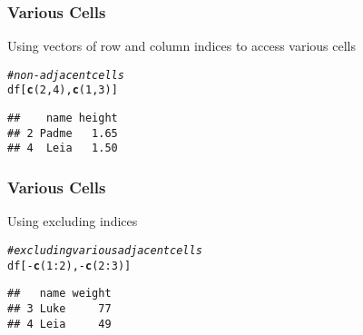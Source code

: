 \documentclass[12pt]{beamer}\usepackage[]{graphicx}\usepackage[]{color}
\makeatletter
\newcommand{\hlnum}[1]{\textcolor[rgb]{0.686,0.059,0.569}{#1}}%
\newcommand{\hlcom}[1]{\textcolor[rgb]{0.678,0.584,0.686}{\textit{#1}}}%
\newcommand{\hlopt}[1]{\textcolor[rgb]{0,0,0}{#1}}%
\newcommand{\hlstd}[1]{\textcolor[rgb]{0.345,0.345,0.345}{#1}}%
\newcommand{\hlkwd}[1]{\textcolor[rgb]{0.737,0.353,0.396}{\textbf{#1}}}%
\newenvironment{kframe}{%
 \def\at@end@of@kframe{}%
 \ifinner\ifhmode%
  \def\at@end@of@kframe{\end{minipage}}%
  \begin{minipage}{\columnwidth}%
 \fi\fi%
 \def\FrameCommand##1{\hskip\@totalleftmargin \hskip-\fboxsep
 \colorbox{shadecolor}{##1}\hskip-\fboxsep
     \hskip-\linewidth \hskip-\@totalleftmargin \hskip\columnwidth}%
 \MakeFramed {\advance\hsize-\width
   \@totalleftmargin\z@ \linewidth\hsize
   \@setminipage}}%
 {\par\unskip\endMakeFramed%
 \at@end@of@kframe}
\newenvironment{knitrout}{}{} %
\makeatother
\begin{document}

\begin{frame}[fragile]
\frametitle{Various Cells}

Using vectors of row and column indices to access various cells
\begin{knitrout}\footnotesize
{}\color{fgcolor}\begin{kframe}
\begin{alltt}
\hlcom{# non-adjacent cells}
\hlstd{df[}\hlkwd{c}\hlstd{(}\hlnum{2}\hlstd{,} \hlnum{4}\hlstd{),} \hlkwd{c}\hlstd{(}\hlnum{1}\hlstd{,} \hlnum{3}\hlstd{)]}
\end{alltt}
\begin{verbatim}
##    name height
## 2 Padme   1.65
## 4  Leia   1.50
\end{verbatim}
\end{kframe}
\end{knitrout}

\end{frame}


\begin{frame}[fragile]
\frametitle{Various Cells}

Using excluding indices
\begin{knitrout}\footnotesize
{}\color{fgcolor}\begin{kframe}
\begin{alltt}
\hlcom{# excluding various adjacent cells}
\hlstd{df[}\hlopt{-}\hlkwd{c}\hlstd{(}\hlnum{1}\hlopt{:}\hlnum{2}\hlstd{),} \hlopt{-}\hlkwd{c}\hlstd{(}\hlnum{2}\hlopt{:}\hlnum{3}\hlstd{)]}
\end{alltt}
\begin{verbatim}
##   name weight
## 3 Luke     77
## 4 Leia     49
\end{verbatim}
\end{kframe}
\end{knitrout}

\end{frame}

\end{document}
